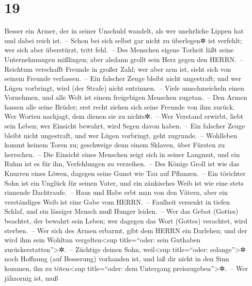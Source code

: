 \hypertarget{section-18}{%
\section{19}\label{section-18}}

Besser ein Armer, der in seiner Unschuld wandelt, als wer
unehrliche Lippen hat und dabei reich ist.~-- Schon bei
sich selbst gar nicht zu überlegen✲ ist verfehlt; wer sich aber
überstürzt, tritt fehl.~-- Des Menschen eigene Torheit
läßt seine Unternehmungen mißlingen; aber alsdann grollt sein Herz gegen
den HERRN.~-- Reichtum verschafft Freunde in großer Zahl;
wer aber arm ist, sieht sich von seinem Freunde verlassen.~--
Ein falscher Zeuge bleibt nicht ungestraft; und wer Lügen
vorbringt, wird (der Strafe) nicht entrinnen.~-- Viele
umschmeicheln einen Vornehmen, und alle Welt ist einem freigebigen
Menschen zugetan.~-- Den Armen hassen alle seine Brüder;
erst recht ziehen sich seine Freunde von ihm zurück. Wer Worten
nachjagt, dem dienen sie zu nichts✲.~-- Wer Verstand
erwirbt, liebt sein Leben; wer Einsicht bewahrt, wird Segen davon
haben.~-- Ein falscher Zeuge bleibt nicht ungestraft, und
wer Lügen vorbringt, geht zugrunde.~-- Wohlleben kommt
keinem Toren zu; geschweige denn einem Sklaven, über Fürsten zu
herrschen.~-- Die Einsicht eines Menschen zeigt sich in
seiner Langmut, und ein Ruhm ist es für ihn, Verfehlungen zu
verzeihen.~-- Des Königs Groll ist wie das Knurren eines
Löwen, dagegen seine Gunst wie Tau auf Pflanzen.~-- Ein
törichter Sohn ist ein Unglück für seinen Vater, und ein zänkisches Weib
ist wie eine stets rinnende Dachtraufe.~-- Haus und Habe
erbt man von den Vätern, aber ein verständiges Weib ist eine Gabe vom
HERRN.~-- Faulheit versenkt in tiefen Schlaf, und ein
lässiger Mensch muß Hunger leiden.~-- Wer das Gebot
(Gottes) beachtet, der bewahrt sein Leben; wer dagegen das Wort (Gottes)
verachtet, wird sterben.~-- Wer sich des Armen erbarmt,
gibt dem HERRN ein Darlehen; und der wird ihm sein Wohltun
vergelten\textless sup title=``oder: sein Guthaben
zurückerstatten''\textgreater✲.~-- Züchtige deinen Sohn,
weil\textless sup title=``oder: solange''\textgreater✲ noch Hoffnung
(auf Besserung) vorhanden ist, und laß dir nicht in den Sinn kommen, ihn
zu töten\textless sup title=``oder: dem Untergang
preiszugeben''\textgreater✲.~-- Wer jähzornig ist, muß
